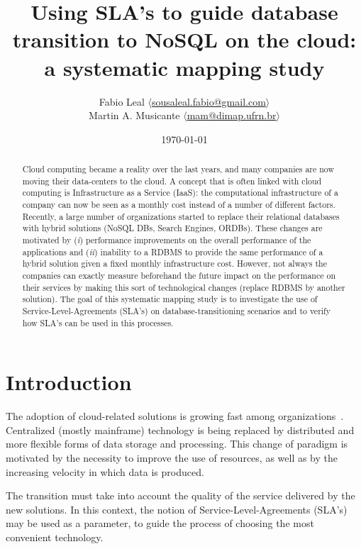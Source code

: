 \documentclass{article}
\begin{document}
\title{Using SLA’s to guide database transition to NoSQL on the cloud: a systematic mapping study}
\author{Fabio Leal $\langle$\href{mailto:sousaleal.fabio@gmail.com}%
{sousaleal.fabio@gmail.com}$\rangle$
\\
Martin A. Musicante $\langle$\href{mailto:mam@dimap.ufrn.br}%
{mam@dimap.ufrn.br}$\rangle$}
\date{\today}
\maketitle  




\begin{abstract}
Cloud computing became a reality over the last years, and many companies are now moving their data-centers to the cloud. 
A concept that is often linked with cloud computing is Infrastructure as a Service (IaaS): the computational infrastructure of a company can now be seen as a monthly cost instead of a number of different factors. 
Recently, a large number of organizations started to replace their relational databases with hybrid solutions (NoSQL DBs, Search Engines, ORDBs). 
These changes are motivated by (\textit{i}) performance improvements on the overall performance of the applications and (\textit{ii}) inability to a RDBMS to provide the same performance of a hybrid solution given a fixed monthly infrastructure cost. 
However, not always the companies can exactly measure beforehand the future impact on the performance on their services by making this sort of technological changes (replace RDBMS by another solution). 
The goal of this systematic mapping study is to investigate the use of Service-Level-Agreements (SLA’s) on database-transitioning scenarios and to verify how SLA’s can be used in this processes.
\end{abstract}

\section{Introduction}

The adoption of cloud-related solutions is growing fast among organizations~\cite{6546068}.
Centralized (mostly mainframe) technology is being replaced by distributed and more flexible forms of data storage and processing.
This change of paradigm is motivated by the necessity to improve the use of resources, as well as by the increasing velocity in which data is produced.

The transition must take into account the quality of the service delivered by the new solutions.
In this context, the notion of Service-Level-Agreements (SLA’s)~\cite{6253526} may be used as a parameter, to guide the process of choosing the most convenient technology.
\end{document}

